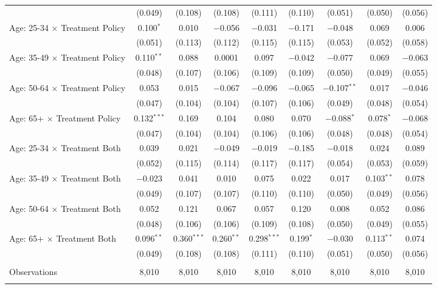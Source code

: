 \begin{tabular}{@{\extracolsep{5pt}}lcccccccc}
  & (0.049) & (0.108) & (0.108) & (0.111) & (0.110) & (0.051) & (0.050) & (0.056) \\ 
 Age: 25-34 $\times$ Treatment Policy & 0.100$^{*}$ & 0.010 & $-$0.056 & $-$0.031 & $-$0.171 & $-$0.048 & 0.069 & 0.006 \\ 
  & (0.051) & (0.113) & (0.112) & (0.115) & (0.115) & (0.053) & (0.052) & (0.058) \\ 
 Age: 35-49 $\times$ Treatment Policy & 0.110$^{**}$ & 0.088 & 0.0001 & 0.097 & $-$0.042 & $-$0.077 & 0.069 & $-$0.063 \\ 
  & (0.048) & (0.107) & (0.106) & (0.109) & (0.109) & (0.050) & (0.049) & (0.055) \\ 
 Age: 50-64 $\times$ Treatment Policy & 0.053 & 0.015 & $-$0.067 & $-$0.096 & $-$0.065 & $-$0.107$^{**}$ & 0.017 & $-$0.046 \\ 
  & (0.047) & (0.104) & (0.104) & (0.107) & (0.106) & (0.049) & (0.048) & (0.054) \\ 
 Age: 65+ $\times$ Treatment Policy & 0.132$^{***}$ & 0.169 & 0.104 & 0.080 & 0.070 & $-$0.088$^{*}$ & 0.078$^{*}$ & $-$0.068 \\ 
  & (0.047) & (0.104) & (0.104) & (0.106) & (0.106) & (0.048) & (0.048) & (0.054) \\ 
 Age: 25-34 $\times$ Treatment Both & 0.039 & 0.021 & $-$0.049 & $-$0.019 & $-$0.185 & $-$0.018 & 0.024 & 0.089 \\ 
  & (0.052) & (0.115) & (0.114) & (0.117) & (0.117) & (0.054) & (0.053) & (0.059) \\ 
 Age: 35-49 $\times$ Treatment Both & $-$0.023 & 0.041 & 0.010 & 0.075 & 0.022 & 0.017 & 0.103$^{**}$ & 0.078 \\ 
  & (0.049) & (0.107) & (0.107) & (0.110) & (0.110) & (0.050) & (0.049) & (0.056) \\ 
 Age: 50-64 $\times$ Treatment Both & 0.052 & 0.121 & 0.067 & 0.057 & 0.120 & 0.008 & 0.052 & 0.086 \\ 
  & (0.048) & (0.106) & (0.106) & (0.109) & (0.108) & (0.050) & (0.049) & (0.055) \\ 
 Age: 65+ $\times$ Treatment Both & 0.096$^{**}$ & 0.360$^{***}$ & 0.260$^{**}$ & 0.298$^{***}$ & 0.199$^{*}$ & $-$0.030 & 0.113$^{**}$ & 0.074 \\ 
  & (0.049) & (0.108) & (0.108) & (0.111) & (0.110) & (0.051) & (0.050) & (0.056) \\ 
\hline \\[-1.8ex] 

Observations & 8,010 & 8,010 & 8,010 & 8,010 & 8,010 & 8,010 & 8,010 & 8,010 \\ 
\hline 
\hline \\[-1.8ex] 
\end{tabular} 
